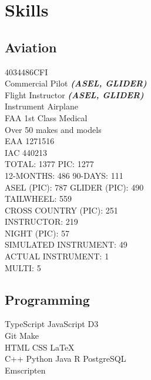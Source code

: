 \documentclass[]{mershon-two-column-resume}
\begin{document}
\begin{minipage}[t]{0.33\textwidth}
		
		\section{Skills}
		
		\subsection{Aviation}
		4034486CFI \\
		Commercial Pilot {\footnotesize \textit{\textbf{(ASEL, GLIDER)}}} \\
		Flight Instructor {\footnotesize \textit{\textbf{(ASEL, GLIDER)}}} \\
		Instrument Airplane \\
		FAA 1st Class Medical \\
		Over 50 makes and models \\
		
		EAA 1271516 \\
		IAC 440213 \\
		
		\sectionsep
		TOTAL: 1377 \textbullet{} PIC: 1277 \\
		12-MONTHS: 486 \textbullet{} 90-DAYS: 111 \\
		ASEL (PIC): 787 \textbullet{} GLIDER (PIC): 490 \\
		TAILWHEEL: 559 \\
		CROSS COUNTRY (PIC): 251 \\
		INSTRUCTOR: 219 \\
		NIGHT (PIC): 57 \\
		SIMULATED INSTRUMENT: 49 \\
		ACTUAL INSTRUMENT: 1 \\
		MULTI: 5 \\
				
		\sectionsep
					
		\subsection{Programming}
		TypeScript \textbullet{} JavaScript \textbullet{} D3 \\
		Git \textbullet{} Make \\
		HTML \textbullet{} CSS \textbullet{} \LaTeX \\
		C++ \textbullet{} Python \textbullet{} Java \textbullet{} R \textbullet{} PostgreSQL \\
		Emscripten
		

\end{minipage}
\end{document}
